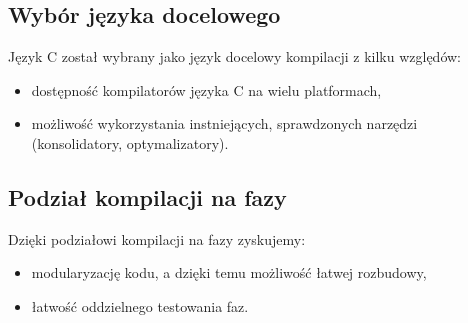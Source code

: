 \documentclass{documentation}
\begin{document}
\subsection{Wybór języka docelowego}
\noindent Język \textsc{C} został wybrany jako język docelowy kompilacji z kilku względów:
\begin{itemize}
    \item dostępność kompilatorów języka \textsc{C} na wielu platformach,
    \item możliwość wykorzystania instniejących, sprawdzonych narzędzi (konsolidatory,
        optymalizatory).
\end{itemize}

\subsection{Podział kompilacji na fazy}
\noindent Dzięki podziałowi kompilacji na fazy zyskujemy:
\begin{itemize}
    \item modularyzację kodu, a dzięki temu możliwość łatwej rozbudowy,
    \item łatwość oddzielnego testowania faz.
\end{itemize}
\end{document}
